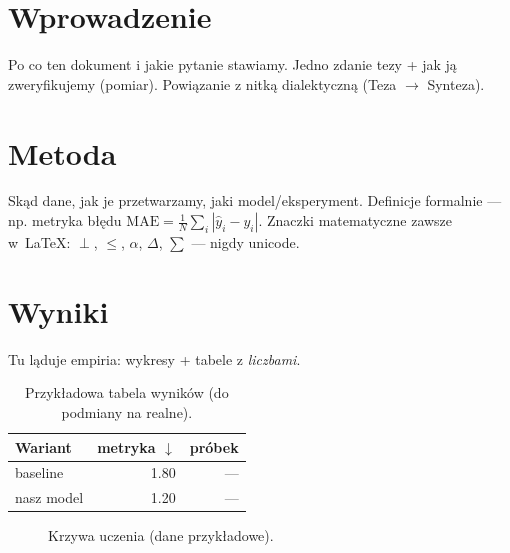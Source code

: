 
\begin{abstract}
\noindent Krótkie streszczenie (3--5 zdań): co badamy, na jakich danych,
jaki wynik. Empiria, nie deklaracje --- każda teza z dowodem.
\end{abstract}

\section{Wprowadzenie}
Po co ten dokument i jakie pytanie stawiamy. Jedno zdanie tezy + jak ją
zweryfikujemy (pomiar). Powiązanie z nitką dialektyczną (Teza $\to$ Synteza).

\section{Metoda}
Skąd dane, jak je przetwarzamy, jaki model/eksperyment. Definicje formalnie ---
np. metryka błędu $\mathrm{MAE} = \frac{1}{N}\sum_i |\hat{y}_i - y_i|$.
Znaczki matematyczne zawsze w~LaTeX: $\perp$, $\le$, $\alpha$, $\Delta$, $\sum$ --- nigdy unicode.

\section{Wyniki}
Tu ląduje empiria: wykresy + tabele z \emph{liczbami}.

\begin{table}[h]
  \centering
  \caption{Przykładowa tabela wyników (do podmiany na realne).}
  \label{tab:wyniki}
  \begin{tabular}{lrr}
    \toprule
    Wariant & metryka $\downarrow$ & próbek \\
    \midrule
    baseline   & 1.80 & --- \\
    nasz model & 1.20 & --- \\
    \bottomrule
  \end{tabular}
\end{table}

\begin{figure}[h]
  \centering
  \caption{Krzywa uczenia (dane przykładowe).}
  \label{fig:learning}
\end{figure}

